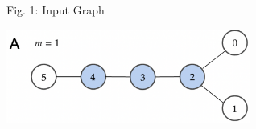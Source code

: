 \begin{rudifig}{\hsize}{Fig. 1: Input Graph}
    
    \hspace{-1em}
    \includegraphics[width=8cm]{latex/Images/input_graph_G_6_0_alternative1.png}
    \label{fig:input_graph}
\end{rudifig}

